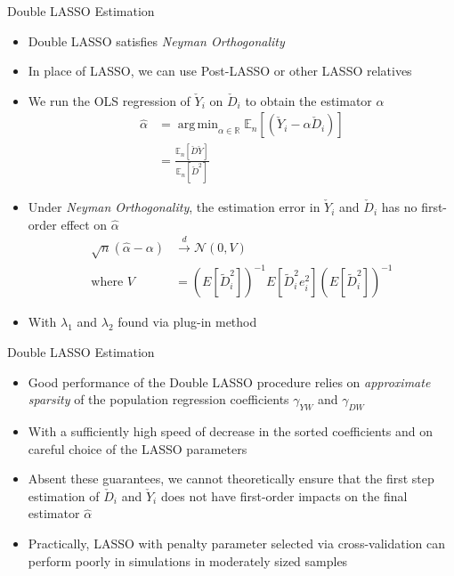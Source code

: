 \documentclass[aspectratio=1610,12pt,xcolor=dvipsnames]{beamer}
\DeclareMathOperator*{\argmin}{arg\,min}
\begin{document}
\begin{frame}{Double LASSO Estimation}

\begin{itemize}
    \item Double LASSO satisfies \textit{Neyman Orthogonality}
    \item In place of LASSO, we can use Post-LASSO or other LASSO relatives
    \item We run the OLS regression of $\check{Y}_i$ on $\check{D}_i$ to obtain the estimator $\hat \alpha$
    \begin{align*}
        \hat \alpha &= \argmin_{\alpha \in  \mathbb{R}} \mathbb{E}_n [(\check Y_i - \alpha \check D_i)] \\
        &= \frac{\mathbb{E}_n [\check D \check Y]}{\mathbb{E}_n[\check D^2]}
    \end{align*}
    \item Under \textit{Neyman Orthogonality}, the estimation error in $\check Y_i$ and $\check D_i$ has no first-order effect on $\hat{\alpha}$
    \begin{align*}
        \sqrt{n}(\hat \alpha - \alpha) &\xrightarrow{d} \mathcal{N} (0,V) \\
        \text{where } V &= (E[\tilde{D}_i^2])^{-1}E[\tilde{D}_i^2e_i^2](E[\tilde{D}_i^2])^{-1}
    \end{align*}
    \item With $\lambda_1$ and $\lambda_2$ found via plug-in method
\end{itemize}
\end{frame}

\begin{frame}{Double LASSO Estimation}

\begin{itemize}
    \item Good performance of the Double LASSO procedure relies on \textit{approximate sparsity} of the population regression coefficients $\gamma_{YW}$ and $\gamma_{DW}$
    \item With a sufficiently high speed of decrease in the sorted coefficients and on careful choice of the LASSO parameters
    \item Absent these guarantees, we cannot theoretically ensure that the first step estimation of $\check D_i$ and $\check Y_i$ does not have first-order impacts on the final estimator $\hat \alpha$
    \item Practically, LASSO with penalty parameter selected via cross-validation can perform poorly in simulations in moderately sized samples
\end{itemize}
\end{frame}
\end{document}
